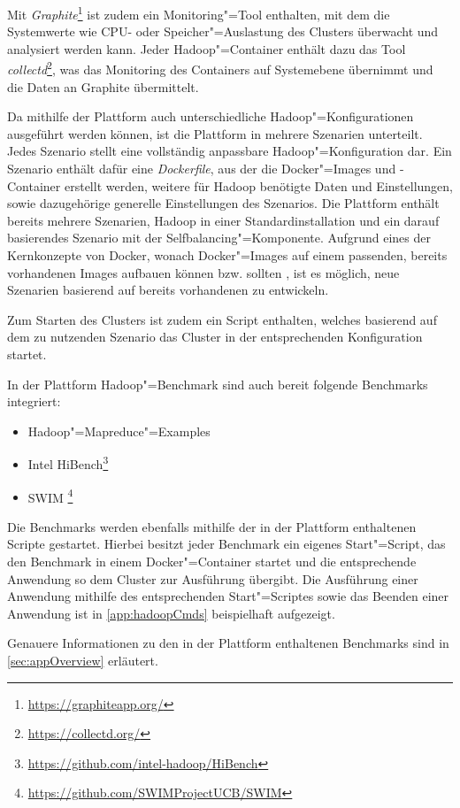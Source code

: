 Mit \emph{Graphite}\footnote{\url{https://graphiteapp.org/}} ist zudem ein Monitoring"=Tool enthalten, mit dem die Systemwerte wie CPU- oder Speicher"=Auslastung des Clusters überwacht und analysiert werden kann.
Jeder Hadoop"=Container enthält dazu das Tool \emph{collectd}\footnote{\url{https://collectd.org/}}, was das Monitoring des Containers auf Systemebene übernimmt und die Daten an Graphite übermittelt.

Da mithilfe der Plattform auch unterschiedliche Hadoop"=Konfigurationen ausgeführt werden können, ist die Plattform in mehrere Szenarien unterteilt.
Jedes Szenario stellt eine vollständig anpassbare Hadoop"=Konfiguration dar.
Ein Szenario enthält dafür eine \emph{Dockerfile}, aus der die Docker"=Images und -Container erstellt werden, weitere für Hadoop benötigte Daten und Einstellungen, sowie dazugehörige generelle Einstellungen des Szenarios.
Die Plattform enthält bereits mehrere Szenarien, \uA Hadoop in einer Standardinstallation und ein darauf basierendes Szenario mit der Selfbalancing"=Komponente.
Aufgrund eines der Kernkonzepte von Docker, wonach Docker"=Images auf einem passenden, bereits vorhandenen Images aufbauen können bzw. sollten \cite{DockerdevBestPractice}, ist es möglich, neue Szenarien basierend auf bereits vorhandenen zu entwickeln.

Zum Starten des Clusters ist zudem ein Script enthalten, welches basierend auf dem zu nutzenden Szenario das Cluster in der entsprechenden Konfiguration startet.

In der Plattform Hadoop"=Benchmark sind auch bereit folgende Benchmarks integriert:

\begin{itemize}
    \item Hadoop"=Mapreduce"=Examples
    \item Intel HiBench\footnote{\url{https://github.com/intel-hadoop/HiBench}}
    \item \gls{SWIM} \footnote{\url{https://github.com/SWIMProjectUCB/SWIM}}
\end{itemize}

Die Benchmarks werden ebenfalls mithilfe der in der Plattform enthaltenen Scripte gestartet.
Hierbei besitzt jeder Benchmark ein eigenes Start"=Script, das den Benchmark in einem Docker"=Container startet und die entsprechende Anwendung so dem Cluster zur Ausführung übergibt.
Die Ausführung einer Anwendung mithilfe des entsprechenden Start"=Scriptes sowie das Beenden einer Anwendung ist in \cref{app:hadoopCmds} beispielhaft aufgezeigt.

Genauere Informationen zu den in der Plattform enthaltenen Benchmarks sind in \cref{sec:appOverview} erläutert.
